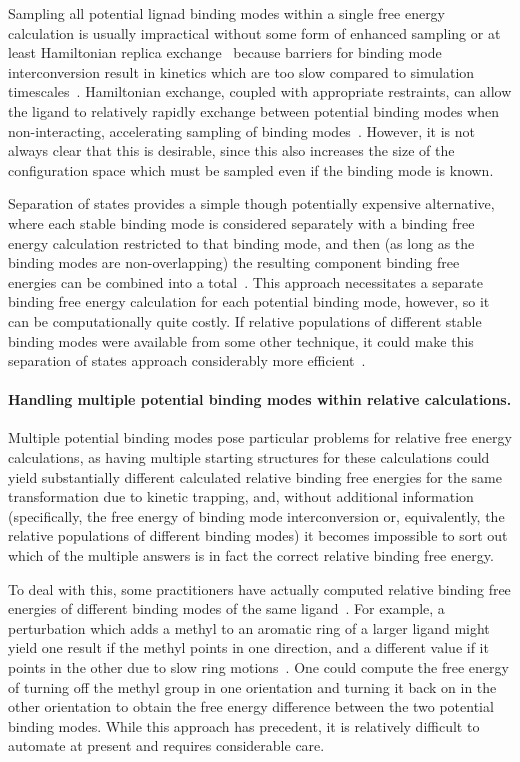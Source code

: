 \documentclass[9pt,bestpractices]{livecoms}
\begin{document}
Sampling all potential lignad binding modes within a single free energy calculation is usually impractical without some form of enhanced sampling or at least Hamiltonian replica exchange~\cite{wang2013identifying} because barriers for binding mode interconversion result in kinetics which are too slow compared to simulation timescales~\cite{mobley2006use, palma2012computation,mobley2012perspective, gill2018binding}.
Hamiltonian exchange, coupled with appropriate restraints, can allow the ligand to relatively rapidly exchange between potential binding modes when non-interacting, accelerating sampling of binding modes~\cite{wang2013identifying}. However, it is not always clear that this is desirable, since this also increases the size of the configuration space which must be sampled even if the binding mode is known.

Separation of states provides a simple though potentially expensive alternative, where each stable binding mode is considered separately with a binding free energy calculation restricted to that binding mode, and then (as long as the binding modes are non-overlapping) the resulting component binding free energies can be combined into a total~\cite{mobley2006use, mobley2012perspective}.
This approach necessitates a separate binding free energy calculation for each potential binding mode, however, so it can be computationally quite costly.
If relative populations of different stable binding modes were available from some other technique, it could make this separation of states approach considerably more efficient~\cite{mobley2012perspective, gill2018binding}.

\paragraph{Handling multiple potential binding modes within relative calculations.}
Multiple potential binding modes pose particular problems for relative free energy calculations, as having multiple starting structures for these calculations could yield substantially different calculated relative binding free energies for the same transformation due to kinetic trapping, and, without additional information (specifically, the free energy of binding mode interconversion or, equivalently, the relative populations of different binding modes) it becomes impossible to sort out which of the multiple answers is in fact the correct relative binding free energy.

To deal with this, some practitioners have actually computed relative binding free energies of different binding modes of the same ligand~\cite{palma2012computation}.
For example, a perturbation which adds a methyl to an aromatic ring of a larger ligand might yield one result if the methyl points in one direction, and a different value if it points in the other due to slow ring motions~\cite{lincoff2016comparing, sasmal2020sampling}.
One could compute the free energy of turning off the methyl group in one orientation and turning it back on in the other orientation to obtain the free energy difference between the two potential binding modes.
While this approach has precedent, it is relatively difficult to automate at present and requires considerable care.
\end{document}

